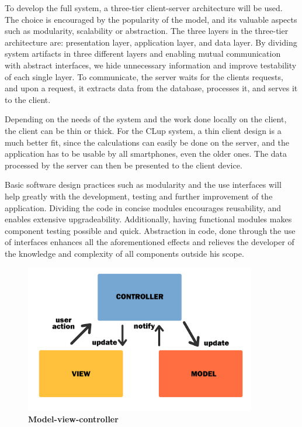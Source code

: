 To develop the full system, a three-tier client-server architecture will be used.  The choice is encouraged by the popularity of the model, and its valuable aspects such as modularity, scalability or abstraction. The three layers in the three-tier architecture are: presentation layer, application layer, and data layer. By dividing system artifacts in three different layers and enabling mutual communication with abstract interfaces, we hide unnecessary information and improve testability of each single layer. To communicate, the server waits for the clients requests, and upon a request, it extracts data from the database, processes it, and serves it to the client.  

Depending on the needs of the system and the work done locally on the client, the client can be thin or thick. For the CLup system, a thin client design is a much better fit, since the calculations can easily be done on the server, and the application has to be usable by all smartphones, even the older ones. The data processed by the server can then be presented to the client device. \newline

Basic software design practices such as modularity and the use interfaces will help greatly with the development, testing and further improvement of the application. Dividing the code in concise modules encourages reusability, and enables extensive upgradeability. Additionally, having functional modules makes component testing possible and quick. Abstraction in code, done through the use of interfaces enhances all the aforementioned effects and relieves the developer of the knowledge and complexity of all components outside his scope. \newline

 

\begin{figure}[!h]
\centering
\includegraphics[width=0.9\textwidth]{Images/MVC}
\caption{\label{fig:mvc}\textbf{Model-view-controller}}
\end{figure} \newpage

